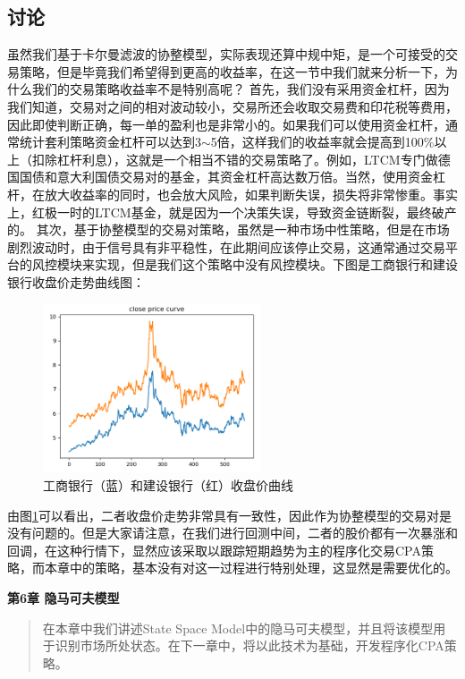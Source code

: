 \documentclass{article}
\begin{document}
\subsection{讨论}
虽然我们基于卡尔曼滤波的协整模型，实际表现还算中规中矩，是一个可接受的交易策略，但是毕竟我们希望得到更高的收益率，在这一节中我们就来分析一下，为什么我们的交易策略收益率不是特别高呢？\newline
首先，我们没有采用资金杠杆，因为我们知道，交易对之间的相对波动较小，交易所还会收取交易费和印花税等费用，因此即使判断正确，每一单的盈利也是非常小的。如果我们可以使用资金杠杆，通常统计套利策略资金杠杆可以达到3$\sim$5倍，这样我们的收益率就会提高到100\%以上（扣除杠杆利息），这就是一个相当不错的交易策略了。例如，LTCM专门做德国国债和意大利国债交易对的基金，其资金杠杆高达数万倍。当然，使用资金杠杆，在放大收益率的同时，也会放大风险，如果判断失误，损失将非常惨重。事实上，红极一时的LTCM基金，就是因为一个决策失误，导致资金链断裂，最终破产的。\newline
其次，基于协整模型的交易对策略，虽然是一种市场中性策略，但是在市场剧烈波动时，由于信号具有非平稳性，在此期间应该停止交易，这通常通过交易平台的风控模块来实现，但是我们这个策略中没有风控模块。下图是工商银行和建设银行收盘价走势曲线图：
\begin{figure}[H]
	\caption{工商银行（蓝）和建设银行（红）收盘价曲线}
	\label{f000065}
	\centering
	\includegraphics[height=5cm]{images/f000065}
\end{figure}
由图\ref{f000065}可以看出，二者收盘价走势非常具有一致性，因此作为协整模型的交易对是没有问题的。但是大家请注意，在我们进行回测中间，二者的股价都有一次暴涨和回调，在这种行情下，显然应该采取以跟踪短期趋势为主的程序化交易CPA策略，而本章中的策略，基本没有对这一过程进行特别处理，这显然是需要优化的。


\maketitle\begin{center}
\Large \textbf{第6章 隐马可夫模型}
\end{center}
\begin{abstract}
在本章中我们讲述State Space Model中的隐马可夫模型，并且将该模型用于识别市场所处状态。在下一章中，将以此技术为基础，开发程序化CPA策略。
\end{abstract}
\end{document}
